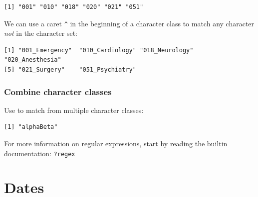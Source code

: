 \documentclass[
]{book}
\newenvironment{Shaded}{\begin{snugshade}}{\end{snugshade}}
\newcommand{\FunctionTok}[1]{\textcolor[rgb]{0.00,0.00,0.00}{#1}}
\newcommand{\NormalTok}[1]{#1}
\newcommand{\OtherTok}[1]{\textcolor[rgb]{0.56,0.35,0.01}{#1}}
\newcommand{\StringTok}[1]{\textcolor[rgb]{0.31,0.60,0.02}{#1}}
\begin{document}
\begin{verbatim}
[1] "001" "010" "018" "020" "021" "051"
\end{verbatim}

We can use a caret \texttt{\^{}} in the beginning of a character class to match any character \emph{not} in the character set:

\begin{Shaded}
\end{Shaded}

\begin{verbatim}
[1] "001_Emergency"  "010_Cardiology" "018_Neurology"  "020_Anesthesia"
[5] "021_Surgery"    "051_Psychiatry"
\end{verbatim}

\hypertarget{combine-character-classes}{%
\subsection{Combine character classes}\label{combine-character-classes}}

Use \texttt{\textbar{}} to match from multiple character classes:

\begin{Shaded}
\end{Shaded}

\begin{verbatim}
[1] "alphaBeta"
\end{verbatim}

For more information on regular expressions, start by reading the builtin documentation: \texttt{?regex}

\hypertarget{dates}{%
\chapter{Dates}\label{dates}}
\end{document}

